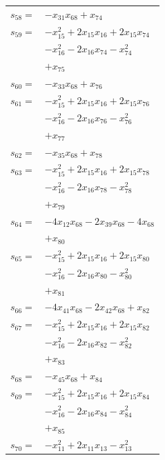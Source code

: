 \begin{longtable}{@{}r@{\;}l@{}}
\(s_{58}=\) & \(\displaystyle -x_{31}x_{68} +x_{74}\) \\[3pt]
\(s_{59}=\) & \(\displaystyle -x_{15}^{2} +2x_{15}x_{16} +2x_{15}x_{74}\) \\
 & \(\displaystyle -x_{16}^{2} -2x_{16}x_{74} -x_{74}^{2}\) \\
 & \(\displaystyle +x_{75}\) \\[3pt]
\(s_{60}=\) & \(\displaystyle -x_{33}x_{68} +x_{76}\) \\[3pt]
\(s_{61}=\) & \(\displaystyle -x_{15}^{2} +2x_{15}x_{16} +2x_{15}x_{76}\) \\
 & \(\displaystyle -x_{16}^{2} -2x_{16}x_{76} -x_{76}^{2}\) \\
 & \(\displaystyle +x_{77}\) \\[3pt]
\(s_{62}=\) & \(\displaystyle -x_{35}x_{68} +x_{78}\) \\[3pt]
\(s_{63}=\) & \(\displaystyle -x_{15}^{2} +2x_{15}x_{16} +2x_{15}x_{78}\) \\
 & \(\displaystyle -x_{16}^{2} -2x_{16}x_{78} -x_{78}^{2}\) \\
 & \(\displaystyle +x_{79}\) \\[3pt]
\(s_{64}=\) & \(\displaystyle -4x_{12}x_{68} -2x_{39}x_{68} -4x_{68}\) \\
 & \(\displaystyle +x_{80}\) \\[3pt]
\(s_{65}=\) & \(\displaystyle -x_{15}^{2} +2x_{15}x_{16} +2x_{15}x_{80}\) \\
 & \(\displaystyle -x_{16}^{2} -2x_{16}x_{80} -x_{80}^{2}\) \\
 & \(\displaystyle +x_{81}\) \\[3pt]
\(s_{66}=\) & \(\displaystyle -4x_{41}x_{68} -2x_{42}x_{68} +x_{82}\) \\[3pt]
\(s_{67}=\) & \(\displaystyle -x_{15}^{2} +2x_{15}x_{16} +2x_{15}x_{82}\) \\
 & \(\displaystyle -x_{16}^{2} -2x_{16}x_{82} -x_{82}^{2}\) \\
 & \(\displaystyle +x_{83}\) \\[3pt]
\(s_{68}=\) & \(\displaystyle -x_{45}x_{68} +x_{84}\) \\[3pt]
\(s_{69}=\) & \(\displaystyle -x_{15}^{2} +2x_{15}x_{16} +2x_{15}x_{84}\) \\
 & \(\displaystyle -x_{16}^{2} -2x_{16}x_{84} -x_{84}^{2}\) \\
 & \(\displaystyle +x_{85}\) \\[3pt]
\(s_{70}=\) & \(\displaystyle -x_{11}^{2} +2x_{11}x_{13} -x_{13}^{2}\) \\

\end{longtable}
